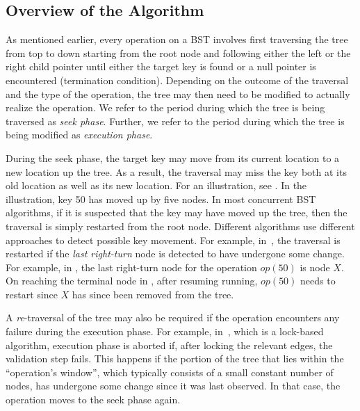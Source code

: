 \subsection{Overview of the Algorithm}
\label{sec:overview}

As mentioned earlier, every operation on a BST involves first traversing the tree from top to down starting from the root node and following either the left or the right child pointer until either the target key is found or a null pointer is encountered (termination condition). Depending on the outcome of the traversal and the type of the operation, the 
tree may then need to be modified to actually realize the operation. We refer to the period during which the tree is being traversed as \emph{seek phase}. Further, we refer to the period during which the tree is being modified as \emph{execution phase}.

During the seek phase, the target key may move from its current location to a new location up the tree. As a result, the traversal may miss the key both at its old location as well as its new location. For an illustration, see . In the illustration, key 50 has moved up by five nodes. In most concurrent BST algorithms, if it is suspected that the key may have moved up the tree, then the traversal is simply restarted from the root node. Different algorithms use different approaches to detect possible key movement. For example, in~\cite{HowJon:2012:SPAA}, the traversal is restarted if the \emph{last right-turn} node is detected to have undergone some change. For example, in , the last right-turn node for the operation $op(50)$ is node $X$. On reaching the terminal node in , after resuming running, $op(50)$ needs to restart since $X$ has since been removed from the tree. 

A \emph{re}-traversal of the tree may also be required if the operation encounters any failure during the execution phase. For example, in~\cite{RamMit:2015:PPoPP}, which is a lock-based algorithm, execution phase is aborted if, after locking the relevant edges, the validation step fails. This happens if the portion of the tree that lies within the ``operation's window'', which typically consists of a small constant number of nodes, has undergone some change since it was last observed. In that case, the operation 
moves to the seek phase again. 


